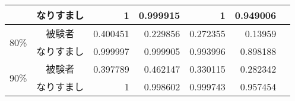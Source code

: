 \begin{center}
\begin{longtable}[btph]{|c|c|r|r|r|r|r|}
           & なりすまし & 1 & 0.999915 & 1 & 0.949006 & \\ \hline
      \multirow{2}{*}{80\%} & 被験者 & 0.400451  & 0.229856  & 0.272355  & 0.13959   & \\ \cline{2-7}
           & なりすまし & 0.999997 & 0.999905 & 0.993996 & 0.898188 & \\ \hline
      \multirow{2}{*}{90\%} & 被験者 & 0.397789  & 0.462147  & 0.330115  & 0.282342  & \\ \cline{2-7}
           & なりすまし & 1 & 0.998602 & 0.999743 & 0.957454 & \\ \hline
  \end{longtable}
\end{center}
